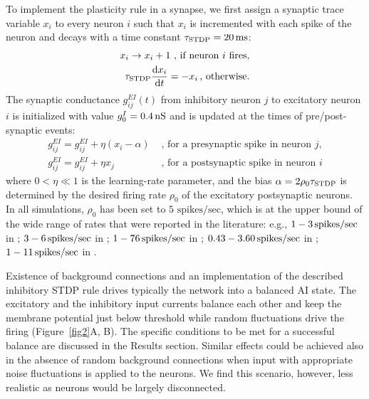     To implement the plasticity rule in a synapse, we first assign a synaptic
    trace variable $x_i$ to every neuron $i$ such that $x_i$ is incremented
    with each spike of the neuron and decays with a time constant $\tau_{\rm
    STDP}=20\,{\rm ms}$:
    \begin{align*}
      x_i \rightarrow x_i+1 {\text{ , if neuron $i$ fires}}\text{,} \\
      \tau_{\rm STDP}\frac{{\rm d}x_i }{{\rm d}t}=-x_i \, {\text{, otherwise}}.
    \end{align*}
    The synaptic conductance $g_{ij}^{EI}(t)$ from inhibitory neuron $j$ to
    excitatory neuron $i$ is initialized with value $g_0^I=0.4 \, \rm nS$ and is
    updated at the times of pre/post-synaptic events:
    \begin{align*}
      g_{ij}^{EI} = g_{ij}^{EI} + \eta(x_i-\alpha) &{\text{    , for a presynaptic spike in neuron $j$,}}\\
      g_{ij}^{EI} = g_{ij}^{EI} + \eta x_j  &{\text{    , for a postsynaptic spike in neuron $i$}}
    \end{align*}
    where $0< \eta \ll 1$ is the learning-rate parameter, and the bias
    $\alpha=2\rho_0\tau_{\rm STDP}$ is determined by the desired firing rate
    $\rho_0$ of the excitatory postsynaptic neurons. In all simulations,
    $\rho_0$ has been set to $5 {\text{ spikes/sec}}$, which is at the upper
    bound of the wide range of rates that were reported in the literature:
    e.g., $1-3 \, \rm spikes/sec$ in \cite{Csicsvari2000}; $3-6 \, \rm
    spikes/sec$ in \cite{Kowalski2015}; $1-76 \, \rm spikes/sec$ in
    \cite{Felsen2005}; $0.43-3.60 \, \rm spikes/sec$ in \cite{Cheng2013}; $1-11
    \, \rm spikes/sec$ in \cite{English2014}.
    
    Existence of background connections and an implementation of the described
    inhibitory STDP rule drives typically the network into a balanced AI state.
    The excitatory and the inhibitory input currents balance each other and
    keep the membrane potential just below threshold while random fluctuations
    drive the firing (Figure~\ref{fig2}A, B). The specific conditions to be met
    for a successful balance are discussed in the Results section. Similar
    effects could be achieved also in the absence of random background
    connections when input with appropriate noise fluctuations is applied to
    the neurons. We find this scenario, however, less realistic as neurons
    would be largely disconnected.

